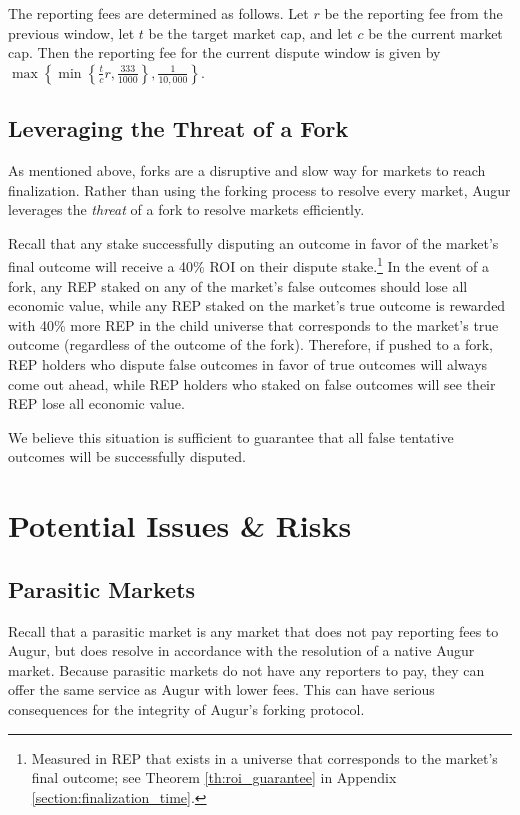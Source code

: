 \documentclass[floatfix,reprint,nofootinbib,amsmath,amssymb,epsfig,pre,floats,letterpaper,groupedaffiliation]{revtex4-1}
\theoremstyle{definition}
\theoremstyle{definition}
\begin{document}
The reporting fees are determined as follows.  Let $r$ be the reporting fee from the previous window, let $t$ be the target market cap, and let $c$ be the current market cap.  Then the reporting fee for the current dispute window is given by $\max\left\{ \min\left\{\frac{t}{c}r, \frac{333}{1000}\right\} , \frac{1}{10,000}\right\}$.

\subsection{Leveraging the Threat of a Fork}\label{section:leveraging_the_threat_of_a_fork}

As mentioned above, forks are a disruptive and slow way for markets to reach finalization.  Rather than using the forking process to resolve every market, Augur leverages the \textit{threat} of a fork to resolve markets efficiently.

Recall that any stake successfully disputing an outcome in favor of the market's final outcome will receive a 40\% ROI on their dispute stake.\footnote{Measured in REP that exists in a universe that corresponds to the market's final outcome; see Theorem \ref{th:roi_guarantee} in Appendix \ref{section:finalization_time}.}  In the event of a fork, any REP staked on any of the market's false outcomes should lose all economic value, while any REP staked on the market's true outcome is rewarded with 40\% more REP in the child universe that corresponds to the market's true outcome (regardless of the outcome of the fork).  Therefore, if pushed to a fork, REP holders who dispute false outcomes in favor of true outcomes will always come out ahead, while REP holders who staked on false outcomes will see their REP lose all economic value.

We believe this situation is sufficient to guarantee that all false tentative outcomes will be successfully disputed.

\section{Potential Issues \& Risks}

\subsection{Parasitic Markets}

Recall that a parasitic market is any market that does not pay reporting fees to Augur, but does resolve in accordance with the resolution of a native Augur market. Because parasitic markets do not have any reporters to pay, they can offer the same service as Augur with lower fees. This can have serious consequences for the integrity of Augur's forking protocol.
\end{document}
